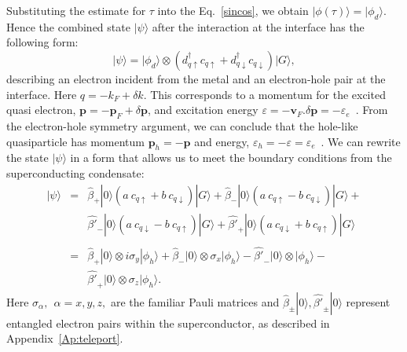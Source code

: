 \documentclass[12pt,letterpaper,aps,onecolumn,superscriptaddress,floatfix,notitlepage]{revtex4-1}
\begin{document}
	Substituting the estimate for $\tau$ into the Eq.~\eqref{sincos}, we obtain $|\phi(\tau)\rangle=|\phi_{d}\rangle.$
	Hence the combined state $|\psi\rangle$ after the interaction at the interface  has the following form:
	\begin{equation}|\psi\rangle = |\phi_{d}\rangle\otimes(d_{q\uparrow}^{\dagger}c_{q\uparrow}+d_{q\downarrow}^{\dagger}c_{q\downarrow})|G\rangle,\end{equation}
	describing an electron incident from the metal and an electron-hole pair at the interface.	Here $q =-k_{F}+\delta k$. This corresponds to a momentum for the excited quasi electron, $\textbf{p}=-\textbf{p}_{F}+\delta \textbf{p}$, and excitation energy $\varepsilon = -\textbf{v}_{F}.\delta \textbf{p} = -\varepsilon_{e}$~\cite{spintron}. From the electron-hole symmetry argument, we can conclude that the hole-like quasiparticle has momentum $\textbf{p}_{h}=-\textbf{p}$ and energy, $\varepsilon_{h} = -\varepsilon = \varepsilon_{e}$~\cite{spintron}. We can rewrite the state $|\psi\rangle$ in a form that allows us to meet the boundary conditions from the superconducting condensate:
	\begin{eqnarray}
	\label{eq:boundary}
	|\psi\rangle &=&\hat{\beta}_{+}|0\rangle(a~c_{q\uparrow}+b~c_{q\downarrow})|G\rangle+\hat{\beta}_{-}|0\rangle(a~c_{q\uparrow}-b~c_{q\downarrow})|G\rangle+\nonumber\\
	&&\hat{\beta'}_{-}|0\rangle(a~c_{q\downarrow}-b~c_{q\uparrow})|G\rangle+\hat{\beta'}_{+}|0\rangle(a~c_{q\downarrow}+b~c_{q\uparrow})|G\rangle~~\\\nonumber\\
	&=& \hat{\beta}_{+}|0\rangle\otimes i\sigma_{y}|\phi_{h}\rangle + \hat{\beta}_{-}|0\rangle\otimes \sigma_{x}|\phi_{h}\rangle-\hat{\beta'}_{-}|0\rangle\otimes|\phi_{h}\rangle- \nonumber\\
	&&\hat{\beta'}_{+}|0\rangle\otimes\sigma_{z}|\phi_{h}\rangle.
	\end{eqnarray}
	Here $\sigma_{\alpha},~~\alpha = x,y,z,$ are the familiar Pauli matrices and $\hat{\beta}_{\pm}|0\rangle,\hat{\beta'}_{\pm}|0\rangle$ represent entangled electron pairs within the superconductor, as described in Appendix~\ref{Ap:teleport}.
\end{document}
